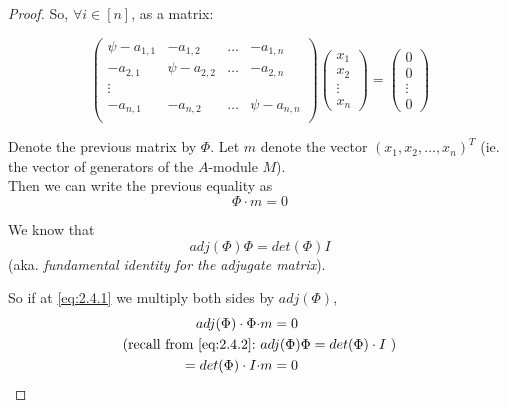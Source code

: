 \documentclass{article}
\theoremstyle{definition}
\begin{document}
\begin{proof}
  So, $\forall i \in [n]$, as a matrix:
  
  $$
  \begin{pmatrix}
    \psi - a_{1,1} & -a_{1,2} & \ldots & -a_{1,n}\\
    -a_{2,1} & \psi-a_{2,2} & \ldots & -a_{2,n}\\
    \vdots\\
    -a_{n,1} & -a_{n,2} & \ldots & \psi-a_{n,n}\\
  \end{pmatrix}
  \begin{pmatrix}
    x_1\\ x_2\\ \vdots\\ x_n
  \end{pmatrix}
  =
  \begin{pmatrix}
    0\\ 0\\ \vdots\\ 0
  \end{pmatrix}
  $$


  
  Denote the previous matrix by $\Phi$. Let $m$ denote the vector $(x_1, x_2, \ldots, x_n)^T$ (ie. the vector of generators of the $A$-module $M$).\\
  \hspace*{4em}Then we can write the previous equality as
  \begin{equation}
    \Phi \cdot m = 0
    \label{eq:2.4.1}
  \end{equation}

  We know that
  \begin{equation}
    adj(\Phi) \Phi = det(\Phi) I
    \label{eq:2.4.2}
  \end{equation}
  (aka. \emph{fundamental identity for the adjugate matrix}).

  So if at \eqref{eq:2.4.1} we multiply both sides by $adj(\Phi)$,
  \begin{align*}
    adj(\Phi) \cdot \Phi \cdot &m = 0\\
    (\text{recall from \eqref{eq:2.4.2}:}~ &adj(\Phi)\Phi=det(\Phi)\cdot I ~)\\
    =det(\Phi) \cdot I \cdot &m = 0
  \end{align*}


\end{proof}
\end{document}
